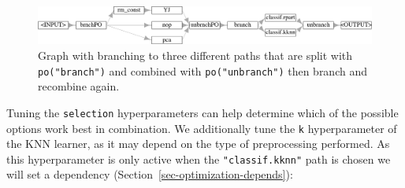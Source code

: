 \begin{Shaded}
\begin{Highlighting}[]
\OtherTok{=}\SpecialCharTok{\%\textgreater{}\textgreater{}\%}
  \NormalTok{(}\NormalTok{, }\NormalTok{(}\NormalTok{(}\NormalTok{, }\NormalTok{)))}
\SpecialCharTok{$}\NormalTok{(} \NormalTok{)}
\end{Highlighting}
\end{Shaded}

\begin{figure}

{\centering \includegraphics[width=1\textwidth,height=\textheight]{chapters/chapter8/non-sequential_pipelines_and_tuning_files/figure-pdf/fig-pipelines-branchtwo-1.png}

}

\caption{\label{fig-pipelines-branchtwo}Graph with branching to three
different paths that are split with \texttt{po("branch")} and combined
with \texttt{po("unbranch")} then branch and recombine again.}

\end{figure}

Tuning the \texttt{selection} hyperparameters can help determine which
of the possible options work best in combination. We additionally tune
the \texttt{k} hyperparameter of the KNN learner, as it may depend on
the type of preprocessing performed. As this hyperparameter is only
active when the \texttt{"classif.kknn"} path is chosen we will set a
dependency (Section~\ref{sec-optimization-depends}):

